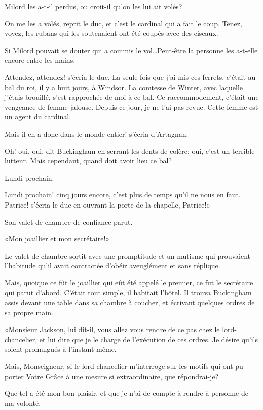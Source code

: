 \speak  Milord les a-t-il perdus, ou croit-il qu'on les lui ait volés? 

\speak  On me les a volés, reprit le duc, et c'est le cardinal qui a fait le coup. Tenez, voyez, les rubans qui les soutenaient ont été coupés avec des ciseaux. 

\speak  Si Milord pouvait se douter qui a commis le vol\dots Peut-être la personne les a-t-elle encore entre les mains. 

\speak  Attendez, attendez! s'écria le duc. La seule fois que j'ai mis ces ferrets, c'était au bal du roi, il y a huit jours, à Windsor. La comtesse de Winter, avec laquelle j'étais brouillé, s'est rapprochée de moi à ce bal. Ce raccommodement, c'était une vengeance de femme jalouse. Depuis ce jour, je ne l'ai pas revue. Cette femme est un agent du cardinal. 

\speak  Mais il en a donc dans le monde entier! s'écria d'Artagnan. 

\speak  Oh! oui, oui, dit Buckingham en serrant les dents de colère; oui, c'est un terrible lutteur. Mais cependant, quand doit avoir lieu ce bal? 

\speak  Lundi prochain. 

\speak  Lundi prochain! cinq jours encore, c'est plus de temps qu'il ne nous en faut. Patrice! s'écria le duc en ouvrant la porte de la chapelle, Patrice!» 

Son valet de chambre de confiance parut. 

«Mon joaillier et mon secrétaire!» 

Le valet de chambre sortit avec une promptitude et un mutisme qui prouvaient l'habitude qu'il avait contractée d'obéir aveuglément et sans réplique. 

Mais, quoique ce fût le joaillier qui eût été appelé le premier, ce fut le secrétaire qui parut d'abord. C'était tout simple, il habitait l'hôtel. Il trouva Buckingham assis devant une table dans sa chambre à coucher, et écrivant quelques ordres de sa propre main. 

«Monsieur Jackson, lui dit-il, vous allez vous rendre de ce pas chez le lord-chancelier, et lui dire que je le charge de l'exécution de ces ordres. Je désire qu'ils soient promulgués à l'instant même. 

\speak  Mais, Monseigneur, si le lord-chancelier m'interroge sur les motifs qui ont pu porter Votre Grâce à une mesure si extraordinaire, que répondrai-je? 

\speak  Que tel a été mon bon plaisir, et que je n'ai de compte à rendre à personne de ma volonté. 


